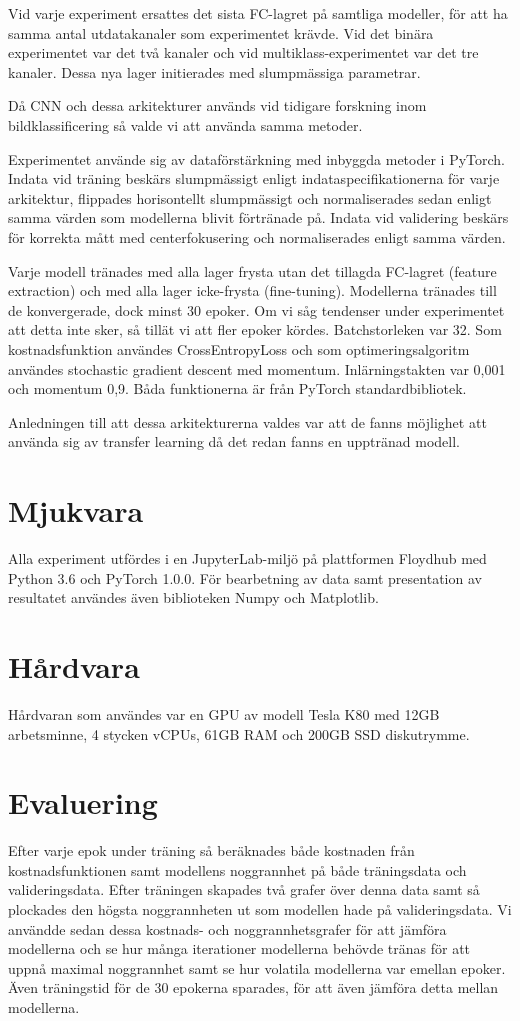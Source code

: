 \documentclass[]{kththesis}
\begin{document}
Vid varje experiment ersattes det sista FC-lagret på samtliga modeller, för att ha samma antal utdatakanaler som experimentet krävde. Vid det binära experimentet var det två kanaler och vid multiklass-experimentet var det tre kanaler. Dessa nya lager initierades med slumpmässiga parametrar.

Då CNN och dessa arkitekturer används vid tidigare forskning inom bildklassificering så valde vi att använda samma metoder.

Experimentet använde sig av dataförstärkning med inbyggda metoder i PyTorch. Indata vid träning beskärs slumpmässigt enligt indataspecifikationerna för varje arkitektur, flippades horisontellt slumpmässigt och normaliserades sedan enligt samma värden som modellerna blivit förtränade på. Indata vid validering beskärs för korrekta mått med centerfokusering och normaliserades enligt samma värden.

Varje modell tränades med alla lager frysta utan det tillagda FC-lagret (feature extraction) och med alla lager icke-frysta (fine-tuning). Modellerna tränades till de konvergerade, dock minst 30 epoker. Om vi såg tendenser under experimentet att detta inte sker, så tillät vi att fler epoker kördes. Batchstorleken var 32. Som kostnadsfunktion användes CrossEntropyLoss och som optimeringsalgoritm användes stochastic gradient descent med momentum. Inlärningstakten var 0,001 och momentum 0,9. Båda funktionerna är från PyTorch standardbibliotek.

Anledningen till att dessa arkitekturerna valdes var att de fanns möjlighet att använda sig av transfer learning då det redan fanns en upptränad modell.

\section{Mjukvara}
Alla experiment utfördes i en JupyterLab-miljö på plattformen Floydhub \parencite{floydhub} med Python 3.6 och PyTorch 1.0.0. För bearbetning av data samt presentation av resultatet användes även biblioteken Numpy och Matplotlib.

\section{Hårdvara}
Hårdvaran som användes var en GPU av modell Tesla K80 med 12GB arbetsminne, 4 stycken vCPUs, 61GB RAM och 200GB SSD diskutrymme.

\section{Evaluering}
Efter varje epok under träning så beräknades både kostnaden från kostnadsfunktionen samt modellens noggrannhet på både träningsdata och valideringsdata. Efter träningen skapades två grafer över denna data samt så plockades den högsta noggrannheten ut som modellen hade på valideringsdata. Vi användde sedan dessa kostnads- och noggrannhetsgrafer för att jämföra modellerna och se hur många iterationer modellerna behövde tränas för att uppnå maximal noggrannhet samt se hur volatila modellerna var emellan epoker. Även träningstid för de 30 epokerna sparades, för att även jämföra detta mellan modellerna.
\end{document}
